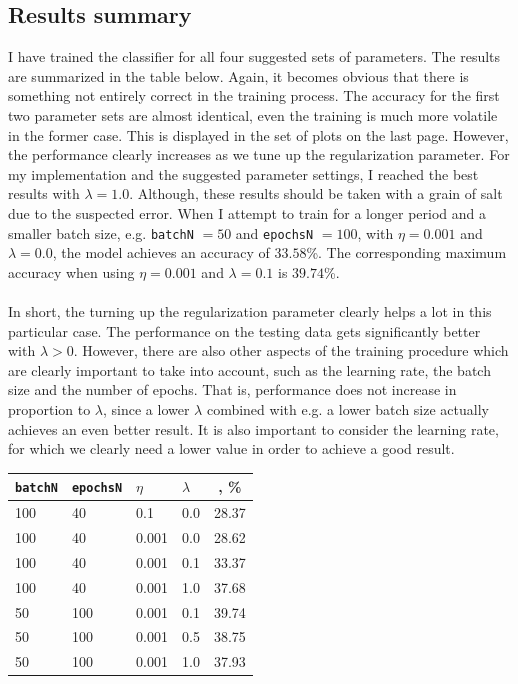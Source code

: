 \documentclass{article}
\begin{document}
\subsection*{Results summary}
	I have trained the classifier for all four suggested sets of parameters. The results are summarized in the table below. Again, it becomes obvious that there is something not entirely correct in the training process. The accuracy for the first two parameter sets are almost identical, even the training is much more volatile in the former case. This is displayed in the set of plots on the last page. However, the performance clearly increases as we tune up the regularization parameter. For my implementation and the suggested parameter settings, I reached the best results with $\lambda = 1.0$. Although, these results should be taken with a grain of salt due to the suspected error. When I attempt to train for a longer period and a smaller batch size, e.g. \texttt{batchN} $=50$ and \texttt{epochsN} $=100$, with $\eta=0.001$ and $\lambda=0.0$, the model achieves an accuracy of $33.58$\%. The corresponding maximum accuracy when using $\eta=0.001$ and $\lambda=0.1$ is $39.74$\%. \\\\
%
In short, the turning up the regularization parameter clearly helps a lot in this particular case. The performance on the testing data gets significantly better with $\lambda > 0$. However, there are also other aspects of the training procedure which are clearly important to take into account, such as the learning rate, the batch size and the number of epochs. That is, performance does not increase in proportion to $\lambda$, since a lower $\lambda$ combined with e.g. a lower batch size actually achieves an even better result. It is also important to consider the learning rate, for which we clearly need a lower value in order to achieve a good result.

	\begin{center}
	\begin{tabular}{|l|l|l|l|c|}
		\hline
		\texttt{batchN} & \texttt{epochsN} & $\eta$ & $\lambda$ & \text{Accuracy}, \% \\ \hline
		100 & 40 & 0.1 & 0.0 & 28.37 \\
		100 & 40 & 0.001 & 0.0 & 28.62\\
		100 & 40 & 0.001 & 0.1 &  33.37\\
		100 & 40 & 0.001 & 1.0 & 37.68\\ 
		50 & 100 & 0.001 & 0.1 & 39.74\\
		50 & 100 & 0.001 & 0.5	 & 38.75\\
		50 & 100 & 0.001 & 1.0 & 37.93\\\hline
	\end{tabular}
	\end{center}
\end{document}
